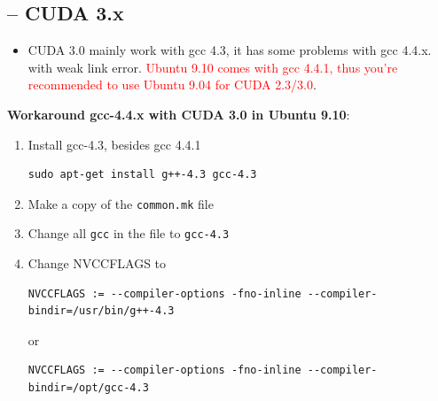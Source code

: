 \subsection{-- CUDA 3.x}

\begin{itemize}
\item CUDA 3.0 mainly work with gcc 4.3, it has some problems with gcc
  4.4.x. with weak link error.
  \textcolor{red}{Ubuntu 9.10 comes with gcc 4.4.1, thus you're
    recommended to use Ubuntu 9.04 for CUDA 2.3/3.0}.
\end{itemize}

{\bf Workaround gcc-4.4.x with CUDA 3.0 in Ubuntu 9.10}:
\begin{enumerate}
\item Install gcc-4.3, besides gcc 4.4.1
\begin{verbatim}
sudo apt-get install g++-4.3 gcc-4.3
\end{verbatim}
\item Make a copy of the \verb!common.mk! file 
\item Change all \verb!gcc! in the file to \verb!gcc-4.3!
\item Change NVCCFLAGS to
\begin{verbatim}
NVCCFLAGS := --compiler-options -fno-inline --compiler-bindir=/usr/bin/g++-4.3
\end{verbatim}
  or 
\begin{verbatim}
NVCCFLAGS := --compiler-options -fno-inline --compiler-bindir=/opt/gcc-4.3
\end{verbatim}

\end{enumerate}




